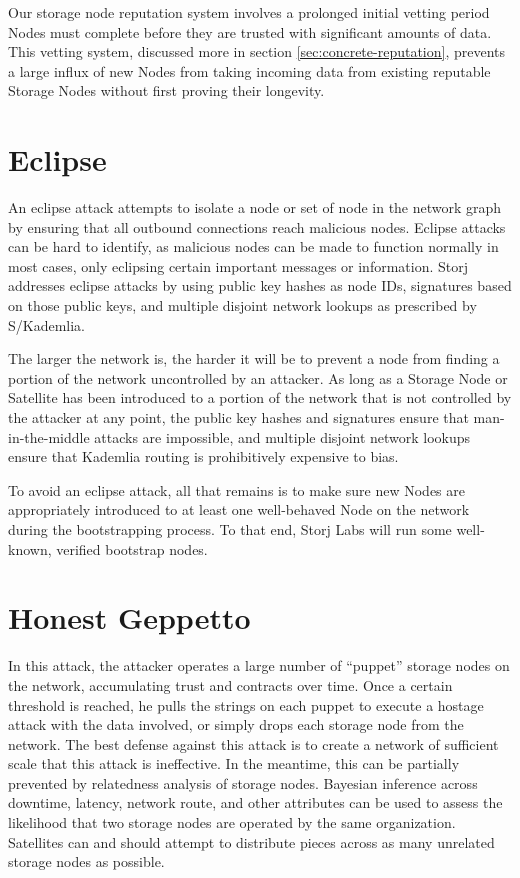 \documentclass[8pt,fleqn,openany]{book}
\begin{document}
Our storage node reputation system involves a prolonged initial vetting
period Nodes must complete before they are trusted with significant amounts
of data. This vetting system, discussed more in section
\ref{sec:concrete-reputation}, prevents a large influx of new Nodes from taking
incoming data from existing reputable Storage Nodes without first proving
their longevity.

\section{Eclipse}

An eclipse attack attempts to isolate a node or set of node in the network
graph by ensuring that all outbound connections reach malicious nodes. Eclipse
attacks can be hard to identify, as malicious nodes can be made to function
normally in most cases, only eclipsing certain important messages or
information. Storj addresses eclipse attacks by using public key hashes as node
IDs, signatures based on those public keys, and multiple disjoint network
lookups as prescribed by S/Kademlia.

The larger the network is, the harder it will
be to prevent a node from finding a portion of the network uncontrolled by
an attacker.
As long as a Storage Node or Satellite has been introduced to a portion of
the network that is not controlled by the attacker at any point, the public
key hashes and signatures ensure that man-in-the-middle attacks are impossible,
and multiple disjoint network lookups ensure that Kademlia routing is
prohibitively expensive to bias.

To avoid an eclipse attack, all that remains
is to make sure new Nodes are appropriately introduced to at least one
well-behaved Node on the network during the bootstrapping process.
To that end, Storj Labs will run some well-known, verified bootstrap nodes.

\section{Honest Geppetto}

In this attack,
the attacker operates a large number of ``puppet'' storage nodes on the network,
accumulating trust and contracts over time. Once a certain threshold is reached,
he pulls the strings on each puppet to execute a hostage attack with the data
involved, or simply drops each storage node from the network. The best defense
against this attack is to create a network of sufficient scale that this attack
is ineffective. In the meantime, this can be partially prevented by relatedness
analysis of storage nodes. Bayesian inference across downtime, latency, network
route, and other
attributes can be used to assess the likelihood that two storage nodes are
operated by the same organization. Satellites can and should attempt to
distribute pieces across as many unrelated storage nodes as possible.
\end{document}
